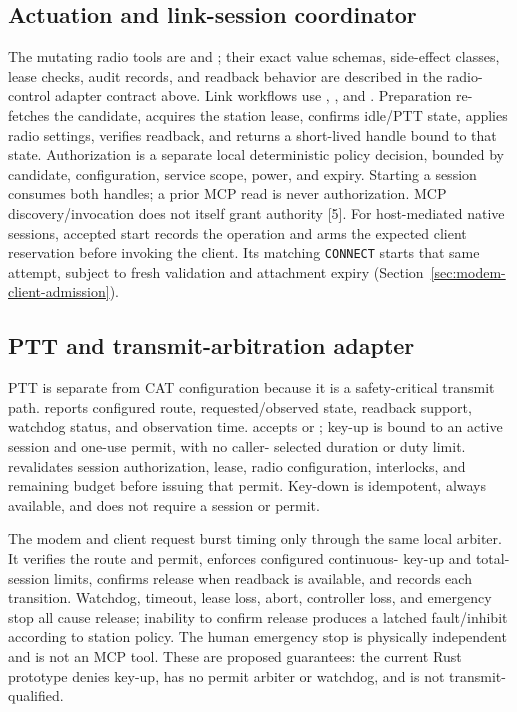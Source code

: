 \documentclass[11pt,a4paper]{article}
\begin{document}
\subsection{Actuation and link-session coordinator}
The mutating radio tools are  and
; their exact value schemas, side-effect classes,
lease checks, audit records, and readback behavior are described in the
radio-control adapter contract above. Link workflows use
, ,
and . Preparation re-fetches the candidate,
acquires the station lease, confirms idle/PTT state, applies radio settings,
verifies readback, and returns a short-lived handle bound to that state.
Authorization is a separate local deterministic policy decision, bounded by
candidate, configuration, service scope, power, and expiry. Starting a
session consumes both handles; a prior MCP read is never authorization. MCP
discovery/invocation does not itself grant authority [5]. For host-mediated
native sessions, accepted start records the operation and arms the expected
client reservation before invoking the client. Its matching \texttt{CONNECT}
starts that same attempt, subject to fresh validation and attachment expiry
(Section~\ref{sec:modem-client-admission}).

\subsection{PTT and transmit-arbitration adapter}
PTT is separate from CAT configuration because it is a safety-critical
transmit path.  reports configured route,
requested/observed state, readback support, watchdog status, and observation
time.  accepts  or ;
key-up is bound to an active session and one-use permit, with no caller-
selected duration or duty limit.  revalidates
session authorization, lease, radio configuration, interlocks, and remaining
budget before issuing that permit. Key-down is idempotent, always available,
and does not require a session or permit.

The modem and client request burst timing only through the same local
arbiter. It verifies the route and permit, enforces configured continuous-
key-up and total-session limits, confirms release when readback is available,
and records each transition. Watchdog, timeout, lease loss, abort, controller
loss, and emergency stop all cause release; inability to confirm release
produces a latched fault/inhibit according to station policy. The human
emergency stop is physically independent and is not an MCP tool. These are
proposed guarantees: the current Rust prototype denies key-up, has no permit
arbiter or watchdog, and is not transmit-qualified.
\end{document}
